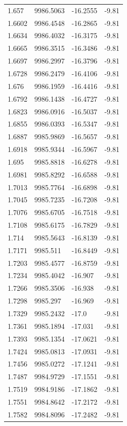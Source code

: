 \begin{table}[H]
\begin{tabular}{llll}
1.657 & 9986.5063 & -16.2555 & -9.81 \\
1.6602 & 9986.4548 & -16.2865 & -9.81 \\
1.6634 & 9986.4032 & -16.3175 & -9.81 \\
1.6665 & 9986.3515 & -16.3486 & -9.81 \\
1.6697 & 9986.2997 & -16.3796 & -9.81 \\
1.6728 & 9986.2479 & -16.4106 & -9.81 \\
1.676 & 9986.1959 & -16.4416 & -9.81 \\
1.6792 & 9986.1438 & -16.4727 & -9.81 \\
1.6823 & 9986.0916 & -16.5037 & -9.81 \\
1.6855 & 9986.0393 & -16.5347 & -9.81 \\
1.6887 & 9985.9869 & -16.5657 & -9.81 \\
1.6918 & 9985.9344 & -16.5967 & -9.81 \\
1.695 & 9985.8818 & -16.6278 & -9.81 \\
1.6981 & 9985.8292 & -16.6588 & -9.81 \\
1.7013 & 9985.7764 & -16.6898 & -9.81 \\
1.7045 & 9985.7235 & -16.7208 & -9.81 \\
1.7076 & 9985.6705 & -16.7518 & -9.81 \\
1.7108 & 9985.6175 & -16.7829 & -9.81 \\
1.714 & 9985.5643 & -16.8139 & -9.81 \\
1.7171 & 9985.511 & -16.8449 & -9.81 \\
1.7203 & 9985.4577 & -16.8759 & -9.81 \\
1.7234 & 9985.4042 & -16.907 & -9.81 \\
1.7266 & 9985.3506 & -16.938 & -9.81 \\
1.7298 & 9985.297 & -16.969 & -9.81 \\
1.7329 & 9985.2432 & -17.0 & -9.81 \\
1.7361 & 9985.1894 & -17.031 & -9.81 \\
1.7393 & 9985.1354 & -17.0621 & -9.81 \\
1.7424 & 9985.0813 & -17.0931 & -9.81 \\
1.7456 & 9985.0272 & -17.1241 & -9.81 \\
1.7487 & 9984.9729 & -17.1551 & -9.81 \\
1.7519 & 9984.9186 & -17.1862 & -9.81 \\
1.7551 & 9984.8642 & -17.2172 & -9.81 \\
1.7582 & 9984.8096 & -17.2482 & -9.81 \\

\end{tabular}
\end{table}
